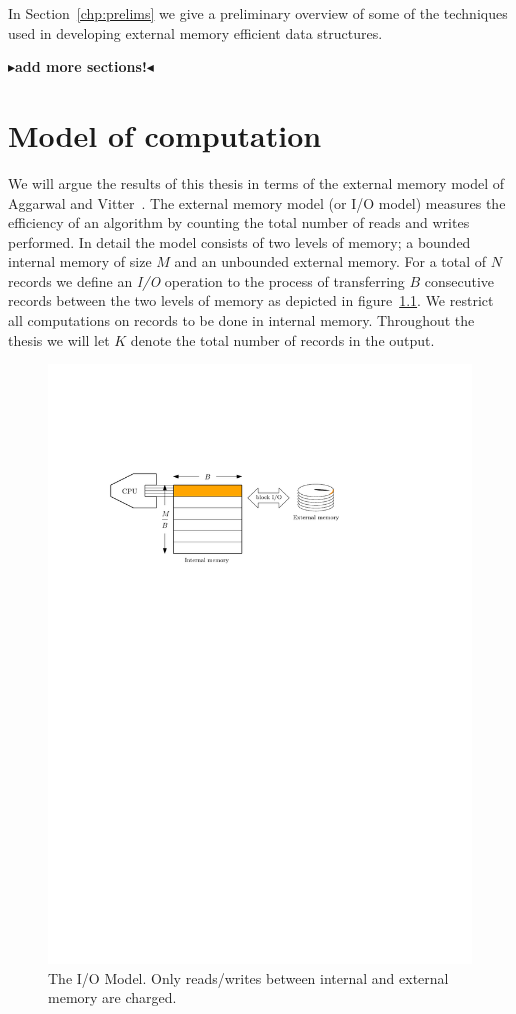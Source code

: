 \documentclass[twoside,11pt,openright]{report}
\newcommand{\todo}[1]{{\color[rgb]{.5,0,0}\textbf{$\blacktriangleright$#1$\blacktriangleleft$}}}
\begin{document}
In Section~\ref{chp:prelims} we give a preliminary overview of some of the techniques used in developing external memory efficient data structures.

\todo{add more sections!}

\chapter{Model of computation}
\label{chp:iomodel}
We will argue the results of this thesis in terms of the external memory model of Aggarwal and Vitter~\cite{Aggarwal:1988/ICS/48529.48535}.
The external memory model (or I/O model) measures the efficiency of an algorithm by counting the total number of reads and writes performed. In detail the model consists of two levels of memory; a bounded internal memory of size $M$ and an unbounded external memory. For a total of $N$ records we define an \textit{I/O} operation to the process of transferring $B$ consecutive records between the two levels of memory as depicted in figure~\ref{fig:io_model}. We restrict all computations on records to be done in internal memory. Throughout the thesis we will let $K$ denote the total number of records in the output.

\begin{figure}[h]
	\centering
	\includegraphics[width=1\textwidth]{../figures/block_io}
	\caption{The I/O Model. Only reads/writes between internal and external memory are charged.}
	\label{fig:io_model}
\end{figure}
\end{document}
